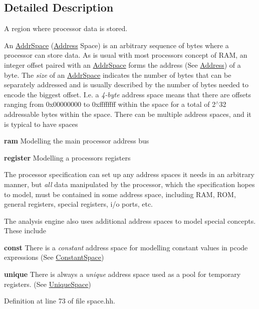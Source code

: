 \subsection{Detailed Description}
A region where processor data is stored. 

An \mbox{\hyperlink{class_addr_space}{Addr\+Space}} (\mbox{\hyperlink{class_address}{Address}} Space) is an arbitrary sequence of bytes where a processor can store data. As is usual with most processors\textquotesingle{} concept of R\+AM, an integer offset paired with an \mbox{\hyperlink{class_addr_space}{Addr\+Space}} forms the address (See \mbox{\hyperlink{class_address}{Address}}) of a byte. The {\itshape size} of an \mbox{\hyperlink{class_addr_space}{Addr\+Space}} indicates the number of bytes that can be separately addressed and is usually described by the number of bytes needed to encode the biggest offset. I.\+e. a {\itshape 4-\/byte} address space means that there are offsets ranging from 0x00000000 to 0xffffffff within the space for a total of 2$^\wedge$32 addressable bytes within the space. There can be multiple address spaces, and it is typical to have spaces
\begin{DoxyItemize}
\item {\bfseries{ram}} Modelling the main processor address bus
\item {\bfseries{register}} Modelling a processors registers
\end{DoxyItemize}

The processor specification can set up any address spaces it needs in an arbitrary manner, but {\itshape all} data manipulated by the processor, which the specification hopes to model, must be contained in some address space, including R\+AM, R\+OM, general registers, special registers, i/o ports, etc.

The analysis engine also uses additional address spaces to model special concepts. These include
\begin{DoxyItemize}
\item {\bfseries{const}} There is a {\itshape constant} address space for modelling constant values in pcode expressions (See \mbox{\hyperlink{class_constant_space}{Constant\+Space}})
\item {\bfseries{unique}} There is always a {\itshape unique} address space used as a pool for temporary registers. (See \mbox{\hyperlink{class_unique_space}{Unique\+Space}}) 
\end{DoxyItemize}

Definition at line 73 of file space.\+hh.



